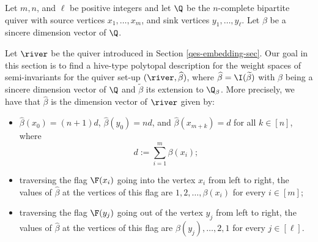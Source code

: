 Let $m,n$, and $\ell$ be positive integers and let $\Q$ be the $n$-complete bipartite quiver with source vertices $x_1, \ldots, x_m$, and sink vertices $y_1, \ldots, y_{\ell}$. Let $\beta$ be a sincere dimension vector of $\Q$.

Let $\river$ be the quiver introduced in Section \ref{qes-embedding-sec}. Our goal in this section is to find a hive-type polytopal description for the weight spaces of semi-invariants for the quiver set-up $(\river, \widehat{\beta})$, where $\widehat{\beta}=\I(\widetilde{\beta})$ with $\beta$ being a sincere dimension vector of $\Q$ and $\widetilde{\beta}$  its extension to $\Q_{\beta}$. More precisely, we have that $\widehat{\beta}$ is the dimension vector of $\river$ given by:
\begin{itemize}
\item $\widehat{\beta}(x_0)=(n+1)d$, $\widehat{\beta}(y_0)=nd$, and $\widehat{\beta}(x_{m+k})=d$ for all $k \in [n]$, where 
$$
d:=\sum_{i=1}^m \beta(x_i);
$$

\item traversing the flag $\F(x_i)$ going into the vertex $x_i$ from left to right, the values of $\widehat{\beta}$ at the vertices of this flag  are $1, 2, \ldots, \beta(x_i)$ for every $i \in [m]$;\\

 \item traversing the flag $\F(y_j)$ going out of the vertex $y_j$ from left to right, the values of $\widehat{\beta}$ at the vertices of this flag  are $\beta(y_j), \ldots, 2, 1$ for every $j \in [\ell]$.
\end{itemize} 

